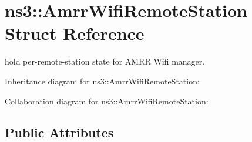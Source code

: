 \hypertarget{structns3_1_1AmrrWifiRemoteStation}{}\section{ns3\+:\+:Amrr\+Wifi\+Remote\+Station Struct Reference}
\label{structns3_1_1AmrrWifiRemoteStation}


hold per-\/remote-\/station state for A\+M\+RR Wifi manager.  




Inheritance diagram for ns3\+:\+:Amrr\+Wifi\+Remote\+Station\+:


Collaboration diagram for ns3\+:\+:Amrr\+Wifi\+Remote\+Station\+:
\subsection*{Public Attributes}
